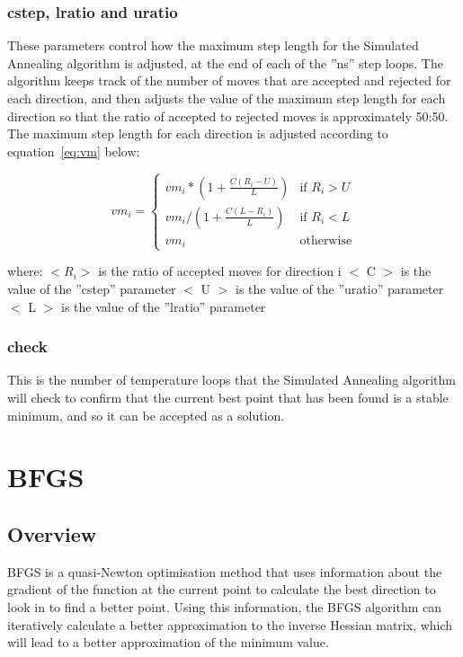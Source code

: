 \documentclass[10pt,twoside]{book}
\begin{document}
\subsubsection{cstep, lratio and uratio}
These parameters control how the maximum step length for the Simulated Annealing algorithm is adjusted, at the end of each of the ''ns'' step loops.  The algorithm keeps track of the number of moves that are accepted and rejected for each direction, and then adjusts the value of the maximum step length for each direction so that the ratio of accepted to rejected moves is approximately 50:50.  The maximum step length for each direction is adjusted according to equation~\ref{eq:vm} below:

\begin{equation}\label{eq:vm}
vm_{i} =
\begin{cases}
vm_{i} * (1 + \frac{C (R_{i} - U)}{L}) & \textrm{if $R_{i} > U$} \\
vm_{i} / (1 + \frac{C (L - R_{i})}{L}) & \textrm{if $R_{i} < L$} \\
vm_{i} & \textrm{otherwise}
\end{cases}
\end{equation}

where:\newline
$< R_{i} >$ is the ratio of accepted moves for direction i\newline
$<$ C $>$ is the value of the ''cstep'' parameter\newline
$<$ U $>$ is the value of the ''uratio'' parameter\newline
$<$ L $>$ is the value of the ''lratio'' parameter

\subsubsection{check}
This is the number of temperature loops that the Simulated Annealing algorithm will check to confirm that the current best point that has been found is a stable minimum, and so it can be accepted as a solution.

\section{BFGS}\label{sec:bfgs}
\subsection{Overview}\label{subsec:bfgsover}
BFGS is a quasi-Newton optimisation method that uses information about the gradient of the function at the current point to calculate the best direction to look in to find a better point.  Using this information, the BFGS algorithm can iteratively calculate a better approximation to the inverse Hessian matrix, which will lead to a better approximation of the minimum value.
\end{document}
